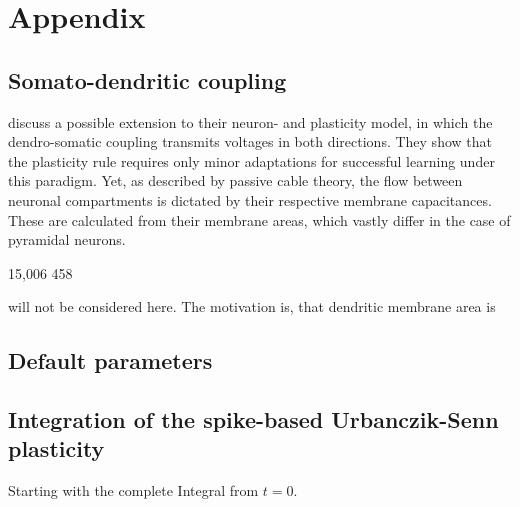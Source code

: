 
\chapter{Appendix}



\section{Somato-dendritic coupling}\label{sec-somato-dendr}

\cite{urbanczik2014learning} discuss a possible extension to their neuron- and plasticity model, in which the
dendro-somatic coupling transmits voltages in both directions. They show that the plasticity rule requires only minor
adaptations for successful learning under this paradigm. Yet, as described by passive cable theory, the flow between
neuronal compartments is dictated by their respective membrane capacitances. These are calculated from their membrane
areas, which vastly differ in the case of pyramidal neurons. 


15,006 458


will not be considered here. The motivation is, that dendritic membrane area is



\section{Default parameters}

\section{Integration of the spike-based Urbanczik-Senn plasticity}



Starting with the complete Integral from $t=0$.

